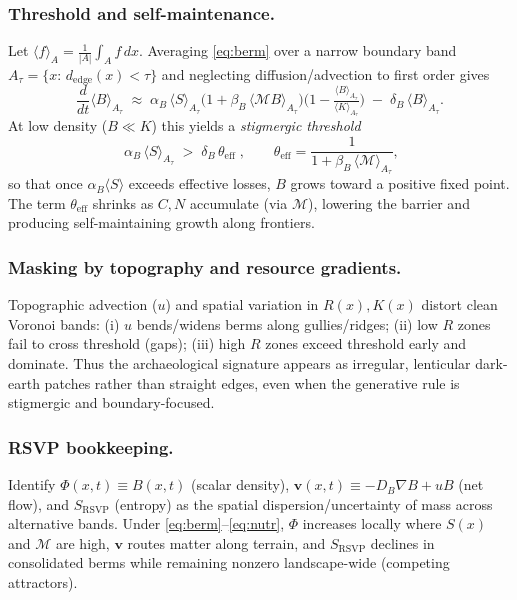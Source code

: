 \documentclass{article}
\begin{document}
\subsubsection{Threshold and self-maintenance.}
Let $\langle f\rangle_A=\frac{1}{|A|}\!\int_A f\,dx$. Averaging \eqref{eq:berm} over a narrow boundary band $A_\tau=\{x:\,d_{\mathrm{edge}}(x)\!<\!\tau\}$ and neglecting diffusion/advection to first order gives
\[
\frac{d}{dt}\langle B\rangle_{A_\tau}\;\approx\;
\alpha_B\,\langle S\rangle_{A_\tau}\Big(1+\beta_B\,\langle\mathcal{M}B\rangle_{A_\tau}\Big)
\Big(1-\tfrac{\langle B\rangle_{A_\tau}}{\langle K\rangle_{A_\tau}}\Big)
\;-\;\delta_B\,\langle B\rangle_{A_\tau}.
\]
At low density ($B\!\ll\!K$) this yields a \emph{stigmergic threshold}
\[
\boxed{\;\alpha_B\,\langle S\rangle_{A_\tau}\;>\;\delta_B\,\theta_{\mathrm{eff}}\;},\qquad
\theta_{\mathrm{eff}}=\frac{1}{1+\beta_B\,\langle\mathcal{M}\rangle_{A_\tau}},
\]
so that once $\alpha_B\langle S\rangle$ exceeds effective losses, $B$ grows toward a positive fixed point. The term $\theta_{\mathrm{eff}}$ shrinks as $C,N$ accumulate (via $\mathcal{M}$), lowering the barrier and producing self-maintaining growth along frontiers.

\subsubsection{Masking by topography and resource gradients.}
Topographic advection ($u$) and spatial variation in $R(x),K(x)$ distort clean Voronoi bands:
(i) $u$ bends/widens berms along gullies/ridges;
(ii) low $R$ zones fail to cross threshold (gaps);
(iii) high $R$ zones exceed threshold early and dominate. Thus the archaeological signature appears as irregular, lenticular dark-earth patches rather than straight edges, even when the generative rule is stigmergic and boundary-focused.

\subsubsection{RSVP bookkeeping.}
Identify $\Phi(x,t)\equiv B(x,t)$ (scalar density), $\mathbf{v}(x,t)\equiv -D_B\nabla B+uB$ (net flow), and $S_{\mathrm{RSVP}}$ (entropy) as the spatial dispersion/uncertainty of mass across alternative bands. Under \eqref{eq:berm}–\eqref{eq:nutr}, $\Phi$ increases locally where $S(x)$ and $\mathcal{M}$ are high, $\mathbf{v}$ routes matter along terrain, and $S_{\mathrm{RSVP}}$ declines in consolidated berms while remaining nonzero landscape-wide (competing attractors).
\end{document}
